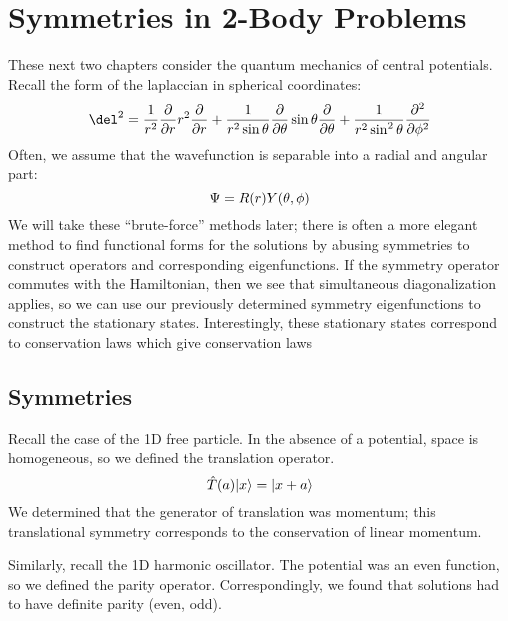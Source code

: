 \chapter{Symmetries in 2-Body Problems}
These next two chapters consider the quantum mechanics of central potentials. Recall the form of the laplaccian in spherical coordinates:
\[\del^2 = \frac{1}{r^2}\pder{}{r}r^2\pder{}{r} + \frac{1}{r^2\sin\theta}\pder{}{\theta}\sin\theta\pder{}{\theta} + \frac{1}{r^2\sin^2\theta}\pder{^2}{\phi^2}\]
Often, we assume that the wavefunction is separable into a radial and angular part:
\[\P = R(r)Y(\theta,\phi)\]
We will take these ``brute-force'' methods later; there is often a more elegant method to find functional forms for the solutions by abusing symmetries to construct operators and corresponding eigenfunctions. If the symmetry operator commutes with the Hamiltonian, then we see that simultaneous diagonalization applies, so we can use our previously determined symmetry eigenfunctions to construct the stationary states. Interestingly, these stationary states correspond to conservation laws which give conservation laws

\section{Symmetries}
Recall the case of the 1D free particle. In the absence of a potential, space is homogeneous, so we defined the translation operator. 
\[\hat T(a)\k{x} = \k{x+a}\]
We determined that the generator of translation was momentum; this translational symmetry corresponds to the conservation of linear momentum.

Similarly, recall the 1D harmonic oscillator. The potential was an even function, so we defined the parity operator. Correspondingly, we found that solutions had to have definite parity (even, odd).

